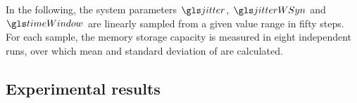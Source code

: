 In the following, the system parameters $\jitter$, $\jitterWSyn$ and $\timeWindow$ are linearly sampled from a given value range in fifty steps. For each sample, the memory storage capacity \info is measured in eight independent runs, over which mean and standard deviation of \info are calculated.

\subsection{Experimental results}

\begin{figure}[t]
	\centering
\end{figure}
